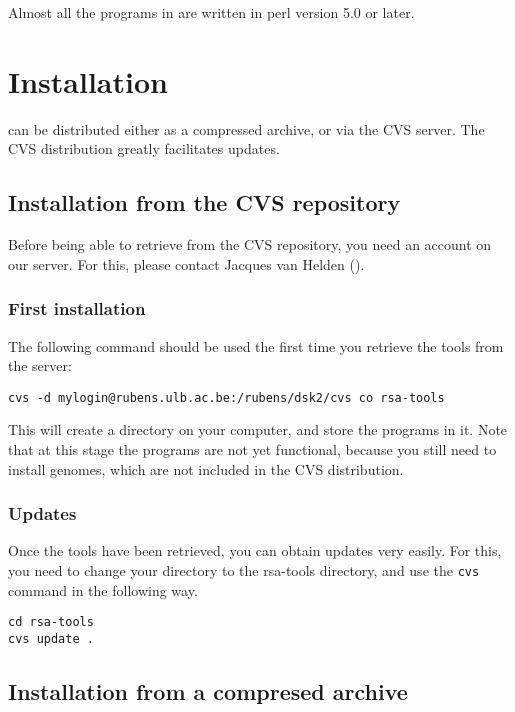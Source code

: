 \documentclass{article}
\begin{document}
Almost all the programs in \RSAT are written in perl version 5.0 or
later.

\section{Installation}

\RSAT can be distributed either as a compressed archive, or via the CVS
server. The CVS distribution greatly facilitates updates.

\subsection{Installation from the CVS repository}

Before being able to retrieve \RSAT from the CVS repository, you need
an account on our server. For this, please contact Jacques van Helden
().

\subsubsection{First installation}

The following command should be used the first time you retrieve the
tools from the server:
\begin{verbatim}
cvs -d mylogin@rubens.ulb.ac.be:/rubens/dsk2/cvs co rsa-tools
\end{verbatim}

This will create a directory  on your computer, and
store the programs in it. Note that at this stage the programs are not
yet functional, because you still need to install genomes, which are
not included in the CVS distribution.

\subsubsection{Updates}

Once the tools have been retrieved, you can obtain updates very
easily. For this, you need to change your directory to the rsa-tools
directory, and use the \texttt{cvs} command in the following way.

\begin{verbatim}
cd rsa-tools
cvs update .
\end{verbatim}

\subsection{Installation from a compresed archive}
\end{document}

